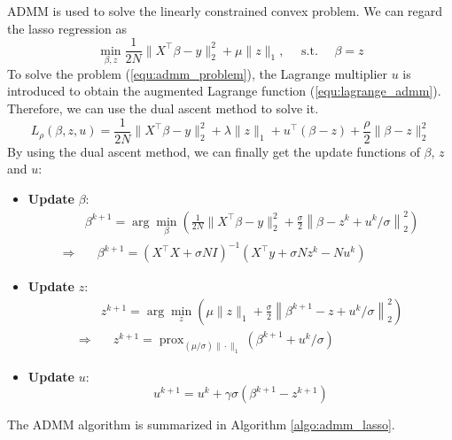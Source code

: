 \documentclass[11pt,en,authoryear]{elegantpaper}
\numberwithin{equation}{section}
\begin{document}
ADMM is used to solve the linearly constrained convex problem. We can regard the lasso regression as
\begin{equation}\label{equ:admm_problem}
\min _{\beta, z} \frac{1}{2N}\|X^{\top}\beta-y\|_{2}^{2}+\mu\|z\|_{1}, \quad \text { s.t. } \quad \beta=z
\end{equation}
To solve the problem (\ref{equ:admm_problem}), the Lagrange multiplier $u$ is introduced to obtain the augmented Lagrange function (\ref{equ:lagrange_admm}). Therefore, we can use the dual ascent method to solve it.
\begin{equation}\label{equ:lagrange_admm}
L_{\rho}(\beta, z, u)=\frac{1}{2N}\|X^{\top} \beta-y\|_{2}^{2}+\lambda\|z\|_{1}+u^{\top}(\beta-z)+\frac{\rho}{2}\|\beta-z\|_{2}^{2}
\end{equation}
By using the dual ascent method, we can finally get the update functions of $\beta$, $z$ and $u$:
\begin{itemize}
    \item \textbf{Update} $\beta$:
    \begin{equation}\label{equ:update_beta}
    \begin{aligned}
    &\beta^{k+1}=\arg \min _{\beta}\left(\frac{1}{2N}\|X^{\top} \beta-y\|_{2}^{2}+\frac{\sigma}{2}\left\|\beta-z^{k}+u^{k} / \sigma\right\|_{2}^{2}\right)\\
    \Rightarrow & \quad \beta^{k+1}=\left(X^{\top} X+\sigma N I\right)^{-1}\left(X^{\top} y+\sigma N z^{k}- N u^{k}\right)
    \end{aligned}
    \end{equation}
    \item \textbf{Update} $z$:
    \begin{equation}\label{equ:update_z}
    \begin{aligned}
    &z^{k+1}=\arg \min _{z}\left(\mu\|z\|_{1}+\frac{\sigma}{2}\left\|{\beta}^{k+1}-z+u^{k} / \sigma\right\|_{2}^{2}\right)\\
    \Rightarrow & \quad z^{k+1}=\operatorname{prox}_{(\mu / \sigma)\|\cdot\|_{1}}\left({\beta}^{k+1}+u^{k} / \sigma\right)
    \end{aligned}
    \end{equation}
    \item \textbf{Update} $u$:
    \begin{equation}\label{equ:update_u}
    u^{k+1}=u^{k}+\gamma \sigma\left({\beta}^{k+1}-z^{k+1}\right)
    \end{equation}
\end{itemize}
The ADMM algorithm is summarized in Algorithm \ref{algo:admm_lasso}.
\end{document}

